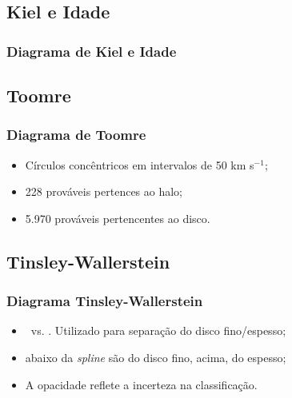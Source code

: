 \documentclass[10pt, aspectratio=169]{slidesiffmodelo}
\begin{document}
\subsection{Kiel e Idade}
\begin{frame}[t,img]
    \frametitle{Diagrama de Kiel e Idade}
    \vspace*{-1em}
\end{frame}

\subsection{Toomre}
\begin{frame}[t, img] %
    \frametitle{Diagrama de Toomre}
    \begin{textoimagem}
        \begin{itemize}
            \item Círculos concêntricos em intervalos de 50 km s$^{-1}$;
            \item 228 \estrela prováveis pertences ao halo; \cite{Bovy2015}
            \item 5.970 \estrela prováveis pertencentes ao disco.
        \end{itemize}
    \colunaimagem
    \end{textoimagem}
\end{frame}

\subsection{Tinsley-Wallerstein}
\begin{frame}[t, img]
    \frametitle{Diagrama Tinsley-Wallerstein}
    \begin{textoimagem}
        \begin{itemize}
            \item \mgfe \, vs. \feh. Utilizado para separação do disco fino/espesso;
            \item \estrela abaixo da \textit{spline} são do disco fino, acima, do espesso;
            \item A opacidade reflete a incerteza na classificação. 
        \end{itemize}
        
    \colunaimagem
    \end{textoimagem}
\end{frame}
\end{document}

